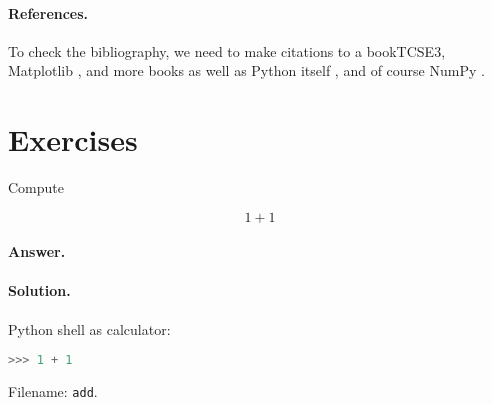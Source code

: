 \documentclass[graybox,sectrefs,envcountresetchap,open=right,final]{svmonodo}
\makeatletter
\newenvironment{doconceexercise}{}{}
\newcounter{doconceexercisecounter}%
\newcommand\listofexercises{
\chapter*{List of Problems
          \@mkboth{List of Problems}{List of Problems}}
\markboth{List of Problems}{List of Problems}
\@starttoc{loe}
}
\makeatother
\begin{document}
\paragraph{References.}
To check the bibliography, we need to make citations to a book{TCSE3},
Matplotlib \cite{Matplotlib:paper}, and more books \cite{Mertz,PythonQt}
as well as Python itself \cite{Python}, and of course NumPy
\cite{NumPy}.

\section{Exercises}

\begin{doconceexercise}

                
\label{exer:add}

Compute

\[ 1 + 1 \]

\paragraph{Answer.}



\paragraph{Solution.}
Python shell as calculator:




\begin{lstlisting}[language=python,style=simple,xleftmargin=2mm]
>>> 1 + 1


\end{lstlisting}


\noindent Filename: \texttt{add}.

\end{doconceexercise}
\end{document}
